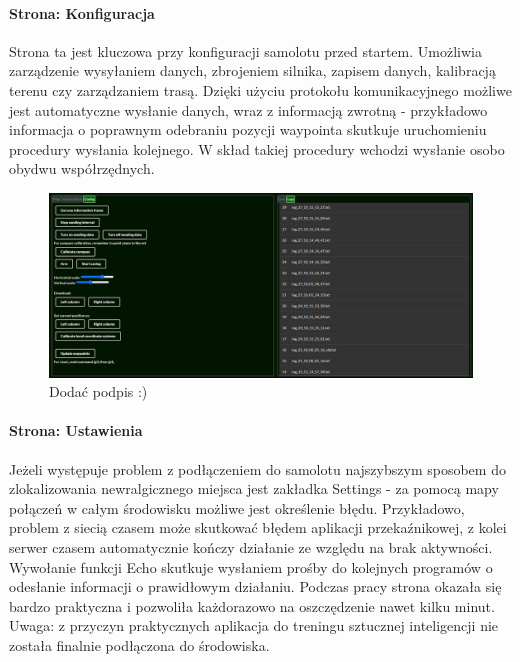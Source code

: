 \documentclass[12pt, a4paper]{article}
\begin{document}
\paragraph{Strona: Konfiguracja}\mbox{}

Strona ta jest kluczowa przy konfiguracji samolotu przed startem. Umożliwia zarządzenie wysyłaniem danych, zbrojeniem silnika, zapisem danych, kalibracją terenu czy zarządzaniem trasą. Dzięki użyciu protokołu komunikacyjnego możliwe jest automatyczne wysłanie danych, wraz z informacją zwrotną - przykładowo informacja o poprawnym odebraniu pozycji waypointa skutkuje uruchomieniu procedury wysłania kolejnego. W skład takiej procedury wchodzi wysłanie osobo obydwu współrzędnych.

 \begin{figure}[H]
    \centering
    \includegraphics[width=1\textwidth]{config}
    \caption{Dodać podpis :)}
\end{figure}

\paragraph{Strona: Ustawienia}\mbox{}

Jeżeli występuje problem z podłączeniem do samolotu najszybszym sposobem do zlokalizowania newralgicznego miejsca jest zakładka Settings - za pomocą mapy połączeń w całym środowisku możliwe jest określenie błędu. Przykładowo, problem z siecią czasem może skutkować błędem aplikacji przekaźnikowej, z kolei serwer czasem automatycznie kończy działanie ze względu na brak aktywności.  Wywołanie funkcji Echo skutkuje wysłaniem prośby do kolejnych programów o odesłanie informacji o prawidłowym działaniu. Podczas pracy strona okazała się bardzo praktyczna i pozwoliła każdorazowo na oszczędzenie nawet kilku minut. Uwaga: z przyczyn praktycznych aplikacja do treningu sztucznej inteligencji nie została finalnie podłączona do środowiska.
\end{document}
